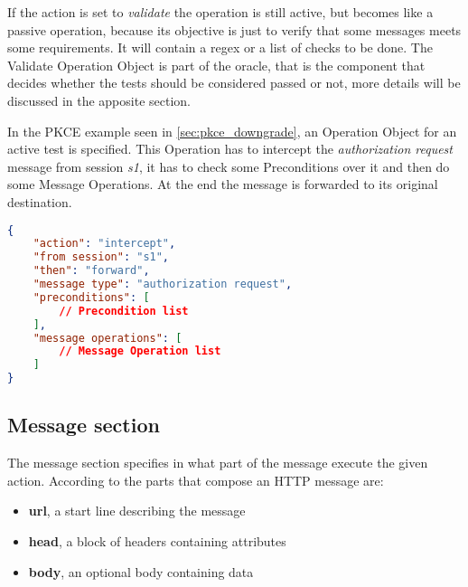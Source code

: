 If the action is set to \textit{validate} the operation is still active, but becomes like a passive operation, because its objective is just to verify that some messages meets some requirements. It will contain a regex or a list of checks to be done. The Validate Operation Object is part of the oracle, that is the component that decides whether the tests should be considered passed or not, more details will be discussed in the apposite section.

In the \gls{PKCE} example seen in \ref{sec:pkce_downgrade}, an Operation Object for an active test is specified. This Operation has to intercept the \textit{authorization request} message from session \textit{s1}, it has to check some Preconditions over it and then do some Message Operations. At the end the message is forwarded to its original destination.

\begin{lstlisting}[language=json, caption=Operation definition]
{
    "action": "intercept",
    "from session": "s1",
    "then": "forward",
    "message type": "authorization request",
    "preconditions": [
        // Precondition list
    ],
    "message operations": [
        // Message Operation list
    ]
}
\end{lstlisting}

\subsection{Message section}
The message section specifies in what part of the message execute the given action.
According to \cite{http} the parts that compose an HTTP message are:
\begin{itemize}
    \item \textbf{url}, a start line describing the message
    \item \textbf{head}, a block of headers containing attributes
    \item \textbf{body}, an optional body containing data
\end{itemize}

